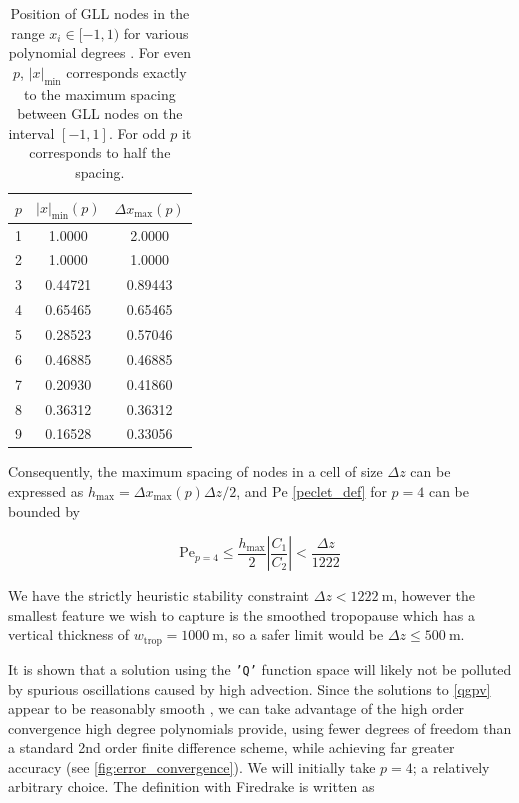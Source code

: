 \documentclass{article}
\begin{document}
\begin{table}[hbtp]
    \centering
    \caption{Position of GLL nodes in the range $x_i \in [-1,1)$ for various polynomial degrees \cite[Table 25.6]{abramowitz1965handbook}. For even $p$, $\left|x\right|_\text{min}$ corresponds exactly to the maximum spacing between GLL nodes on the interval $[-1,1]$. For odd $p$ it corresponds to half the spacing.}
    \label{tab:gll_max_spacing}
    \begin{tabular}{ccc}
        \toprule
        $p$ & $\left|x\right|_\text{min}(p)$ & $\Delta x _\text{max} (p)$ \\
        \midrule
        1 & 1.0000 & 2.0000 \\
        2 & 1.0000 & 1.0000 \\
        3 & 0.44721 & 0.89443 \\
        4 & 0.65465 & 0.65465 \\
        5 & 0.28523 & 0.57046 \\
        6 & 0.46885 & 0.46885 \\
        7 & 0.20930 & 0.41860 \\
        8 & 0.36312 & 0.36312 \\
        9 & 0.16528 & 0.33056 \\
        \bottomrule
    \end{tabular}
\end{table} %

Consequently, the maximum spacing of nodes in a cell of size $\Delta z$ can be expressed as $h_\text{max} = \Delta x _\text{max} (p) \Delta z / 2$, and $\mathrm{Pe}$ \eqref{peclet_def} for $p=4$ can be bounded by

\begin{equation}\label{peclet_bound}
    \mathrm{Pe}_{p=4} \leq \frac{h_\text{max}}{2} \left| \frac{C_1}{C_2}\right| <  \frac{\Delta z}{1222}
\end{equation}

We have the strictly heuristic stability constraint $\Delta z < \qty{1222}{\meter}$, however the smallest feature we wish to capture is the smoothed tropopause which has a vertical thickness of $w_\text{trop} = \qty{1000}{\meter}$, so a safer limit would be $\Delta z \leq \qty{500}{\meter}$.

It is shown that a solution using the \texttt{'Q'} function space will likely not be polluted by spurious oscillations caused by high advection.
Since the solutions to \cref{qgpv} appear to be reasonably smooth \cite{Barnes2022main}, we can take advantage of the high order convergence high degree polynomials provide, using fewer degrees of freedom than a standard 2nd order finite difference scheme, while achieving far greater accuracy \cite{Donea2003} (see \cref{fig:error_convergence}).
We will initially take $p=4$; a relatively arbitrary choice.
The definition with Firedrake is written as
\end{document}

